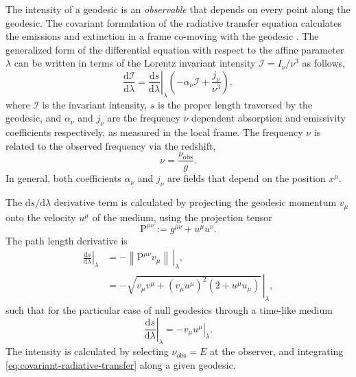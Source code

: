 \documentclass[fleqn,usenatbib]{mnras}
\renewcommand{\d}{\text{d}}
\begin{document}
The intensity of a geodesic is an \emph{observable} that depends on every point
along the geodesic. The covariant formulation of the radiative transfer equation
calculates the emissions and extinction in a frame co-moving with the geodesic
\citep{fuerst_radiation_2004,younsi_general_2012}. The generalized form of the
differential equation with respect to the affine parameter $\lambda$ can be
written in terms of the Lorentz invariant intensity $\mathcal{I} = I_\nu /
\nu^3$ \citep{lindquist_louville_1966} as follows,
\begin{equation}
    \label{eq:covariant-radiative-transfer}
    \frac{\d \mathcal{I}}{\d \lambda} = \left. \frac{\d s}{\d \lambda} \right\rvert_\lambda \left( -\alpha_\nu \mathcal{I} + \frac{j_\nu}{\nu^3} \right),
\end{equation}
where $\mathcal{I}$ is the invariant intensity, $s$ is the proper length
traversed by the geodesic, and $\alpha_\nu$ and $j_\nu$ are the frequency $\nu$
dependent absorption and emissivity coefficients respectively, as measured in
the local frame. The frequency $\nu$ is related to the observed frequency via
the redshift,
\begin{equation}
    \nu = \frac{\nu_\text{obs}}{g}.
\end{equation}
In general, both coefficients $\alpha_\nu$ and $j_\nu$ are fields that depend on
the position $x^\mu$.

The $\d s / \d \lambda$ derivative term is calculated by projecting the geodesic
momentum $v_\mu$ onto the velocity $u^\mu$ of the medium, using the projection
tensor
\begin{equation}
    \mathrm{P}^{\mu\nu} := g^{\mu\nu} + u^\mu u^\nu.
\end{equation}
The path length derivative is
\begin{align}
    \left. \frac{\d s}{\d \lambda} \right\rvert_\lambda
    &= - \left. \left\lVert \mathrm{P}^{\mu\nu} v_\mu\right\rVert\, \right\rvert_\lambda,\\
    &= - \left. \sqrt{v_\mu v^\mu + \left(v_\mu u^\mu\right)^2 \left(2 + u^\mu u_\mu\right)} \, \right\rvert_\lambda,
\end{align}
such that for the particular case of null geodesics through a time-like medium
\begin{equation}
    \left. \frac{\d s}{\d \lambda} \right\rvert_\lambda = - \left. v_\mu u^\mu \right\rvert_\lambda.
\end{equation}
The intensity is calculated by selecting $\nu_\text{obs} = E$ at the observer,
and integrating \eqref{eq:covariant-radiative-transfer} along a given geodesic.
\end{document}
